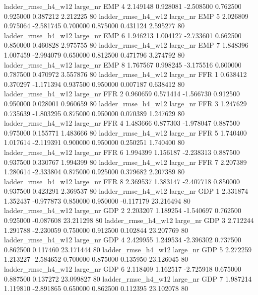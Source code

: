  ladder_rmse_h4_w12   large_nr      EMP                 4  2.149148  0.928081  -2.508500 0.762500 0.925000  0.387212    2.212225 80
 ladder_rmse_h4_w12   large_nr      EMP                 5  2.026809  0.975064  -2.581745 0.700000 0.875000  0.431124    2.595277 80
 ladder_rmse_h4_w12   large_nr      EMP                 6  1.946213  1.004127  -2.733601 0.662500 0.850000  0.460828    2.975755 80
 ladder_rmse_h4_w12   large_nr      EMP                 7  1.848396  1.007459  -2.994079 0.650000 0.812500  0.471796    3.274792 80
 ladder_rmse_h4_w12   large_nr      EMP                 8  1.767567  0.998245  -3.175516 0.600000 0.787500  0.470972    3.557876 80
 ladder_rmse_h4_w12   large_nr      FFR                 1  0.638412  0.370297  -1.171394 0.937500 0.950000  0.007187    0.638412 80
 ladder_rmse_h4_w12   large_nr      FFR                 2  0.960659  0.571414  -1.566730 0.912500 0.950000  0.028001    0.960659 80
 ladder_rmse_h4_w12   large_nr      FFR                 3  1.247629  0.735639  -1.803295 0.875000 0.950000  0.070389    1.247629 80
 ladder_rmse_h4_w12   large_nr      FFR                 4  1.483666  0.877303  -1.978047 0.887500 0.975000  0.155771    1.483666 80
 ladder_rmse_h4_w12   large_nr      FFR                 5  1.740400  1.017614  -2.119391 0.900000 0.950000  0.250251    1.740400 80
 ladder_rmse_h4_w12   large_nr      FFR                 6  1.994399  1.156187  -2.238313 0.887500 0.937500  0.330767    1.994399 80
 ladder_rmse_h4_w12   large_nr      FFR                 7  2.207389  1.280614  -2.333804 0.875000 0.925000  0.379682    2.207389 80
 ladder_rmse_h4_w12   large_nr      FFR                 8  2.369537  1.383147  -2.407718 0.850000 0.937500  0.423291    2.369537 80
 ladder_rmse_h4_w12   large_nr      GDP                 1  2.331874  1.352437  -0.977873 0.850000 0.950000 -0.117179   23.216494 80
 ladder_rmse_h4_w12   large_nr      GDP                 2  2.203207  1.189254  -1.540697 0.762500 0.925000 -0.087608   23.211298 80
 ladder_rmse_h4_w12   large_nr      GDP                 3  2.712244  1.291788  -2.230059 0.750000 0.912500  0.102844   23.207769 80
 ladder_rmse_h4_w12   large_nr      GDP                 4  2.429955  1.249534  -2.396302 0.737500 0.862500  0.117460   23.171444 80
 ladder_rmse_h4_w12   large_nr      GDP                 5  2.272259  1.213227  -2.584652 0.700000 0.875000  0.135950   23.126045 80
 ladder_rmse_h4_w12   large_nr      GDP                 6  2.118409  1.162517  -2.725918 0.675000 0.887500  0.137272   23.099827 80
 ladder_rmse_h4_w12   large_nr      GDP                 7  1.987214  1.119810  -2.891865 0.650000 0.862500  0.112395   23.102078 80
